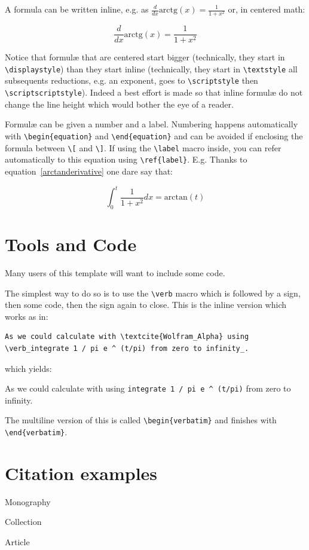 A formula can be written inline, e.g. as $ \frac{d}{dx}\mbox{arctg}(x) = \frac{1}{1+x^2}$ or, in centered math:

\begin{equation}  \frac{d}{dx}\mbox{arctg}(x) = \frac{1}{1+x^2} \label{arctanderivative}\end{equation}

Notice that formulæ that are centered start bigger (technically, they start in \verb+\displaystyle+) than they start inline (technically, they start in \verb+\textstyle+ all subsequents reductions, e.g. an exponent, goes to \verb+\scriptstyle+ then \verb+\scriptscriptstyle+). Indeed a best effort is made so that inline formulæ do not change the line height which would bother the eye of a reader.

Formulæ can be given a number and a label. Numbering happens automatically with \verb+\begin{equation}+ and \verb+\end{equation}+ and can be avoided if enclosing the formula between \verb+\[+ and \verb+\]+. If using the \verb+\label+ macro inside, you can refer automatically to this equation using \verb+\ref{label}+. E.g. Thanks to equation~\ref{arctanderivative} one dare say that:

\begin{equation} \int_0^t \frac{1}{1+x^2} dx = \mbox{arctan}(t) \end{equation}


\section{Tools and Code}

Many users of this template will want to include some code.

The simplest way to do so is to use the \verb+\verb+ macro which is followed by a sign, then some code, then the sign again to close. This is the inline version which works as in: 


\begin{verbatim}
As we could calculate with \textcite{Wolfram_Alpha} using 
\verb_integrate 1 / pi e ^ (t/pi) from zero to infinity_.
\end{verbatim}

which yields: 

As we could calculate with \textcite{Wolfram_Alpha} using \verb_integrate 1 / pi e ^ (t/pi)_ from zero to infinity.


The multiline version of this is called \verb+\begin{verbatim}+ and finishes with \verb+\end{verbatim}+.


\section{Citation examples}

Monography \parencite[p.~22]{con:infra} 

Collection \parencite{sammelband} 

Article \parencite{article1}
